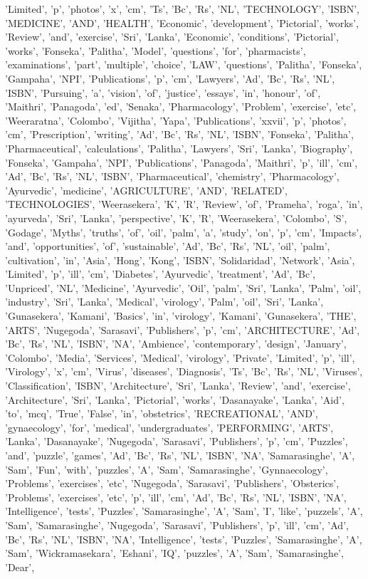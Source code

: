 'Limited', 'p', 'photos', 'x', 'cm', 'Ts', 'Bc', 'Rs', 'NL', 'TECHNOLOGY', 'ISBN', 'MEDICINE', 'AND', 'HEALTH', 'Economic', 'development', 'Pictorial', 'works', 'Review', 'and', 'exercise', 'Sri', 'Lanka', 'Economic', 'conditions', 'Pictorial', 'works', 'Fonseka', 'Palitha', 'Model', 'questions', 'for', 'pharmacists', 'examinations', 'part', 'multiple', 'choice', 'LAW', 'questions', 'Palitha', 'Fonseka', 'Gampaha', 'NPI', 'Publications', 'p', 'cm', 'Lawyers', 'Ad', 'Bc', 'Rs', 'NL', 'ISBN', 'Pursuing', 'a', 'vision', 'of', 'justice', 'essays', 'in', 'honour', 'of', 'Maithri', 'Panagoda', 'ed', 'Senaka', 'Pharmacology', 'Problem', 'exercise', 'etc', 'Weeraratna', 'Colombo', 'Vijitha', 'Yapa', 'Publications', 'xxvii', 'p', 'photos', 'cm', 'Prescription', 'writing', 'Ad', 'Bc', 'Rs', 'NL', 'ISBN', 'Fonseka', 'Palitha', 'Pharmaceutical', 'calculations', 'Palitha', 'Lawyers', 'Sri', 'Lanka', 'Biography', 'Fonseka', 'Gampaha', 'NPI', 'Publications', 'Panagoda', 'Maithri', 'p', 'ill', 'cm', 'Ad', 'Bc', 'Rs', 'NL', 'ISBN', 'Pharmaceutical', 'chemistry', 'Pharmacology', 'Ayurvedic', 'medicine', 'AGRICULTURE', 'AND', 'RELATED', 'TECHNOLOGIES', 'Weerasekera', 'K', 'R', 'Review', 'of', 'Prameha', 'roga', 'in', 'ayurveda', 'Sri', 'Lanka', 'perspective', 'K', 'R', 'Weerasekera', 'Colombo', 'S', 'Godage', 'Myths', 'truths', 'of', 'oil', 'palm', 'a', 'study', 'on', 'p', 'cm', 'Impacts', 'and', 'opportunities', 'of', 'sustainable', 'Ad', 'Bc', 'Rs', 'NL', 'oil', 'palm', 'cultivation', 'in', 'Asia', 'Hong', 'Kong', 'ISBN', 'Solidaridad', 'Network', 'Asia', 'Limited', 'p', 'ill', 'cm', 'Diabetes', 'Ayurvedic', 'treatment', 'Ad', 'Bc', 'Unpriced', 'NL', 'Medicine', 'Ayurvedic', 'Oil', 'palm', 'Sri', 'Lanka', 'Palm', 'oil', 'industry', 'Sri', 'Lanka', 'Medical', 'virology', 'Palm', 'oil', 'Sri', 'Lanka', 'Gunasekera', 'Kamani', 'Basics', 'in', 'virology', 'Kamani', 'Gunasekera', 'THE', 'ARTS', 'Nugegoda', 'Sarasavi', 'Publishers', 'p', 'cm', 'ARCHITECTURE', 'Ad', 'Bc', 'Rs', 'NL', 'ISBN', 'NA', 'Ambience', 'contemporary', 'design', 'January', 'Colombo', 'Media', 'Services', 'Medical', 'virology', 'Private', 'Limited', 'p', 'ill', 'Virology', 'x', 'cm', 'Virus', 'diseases', 'Diagnosis', 'Ts', 'Bc', 'Rs', 'NL', 'Viruses', 'Classification', 'ISBN', 'Architecture', 'Sri', 'Lanka', 'Review', 'and', 'exercise', 'Architecture', 'Sri', 'Lanka', 'Pictorial', 'works', 'Dasanayake', 'Lanka', 'Aid', 'to', 'mcq', 'True', 'False', 'in', 'obstetrics', 'RECREATIONAL', 'AND', 'gynaecology', 'for', 'medical', 'undergraduates', 'PERFORMING', 'ARTS', 'Lanka', 'Dasanayake', 'Nugegoda', 'Sarasavi', 'Publishers', 'p', 'cm', 'Puzzles', 'and', 'puzzle', 'games', 'Ad', 'Bc', 'Rs', 'NL', 'ISBN', 'NA', 'Samarasinghe', 'A', 'Sam', 'Fun', 'with', 'puzzles', 'A', 'Sam', 'Samarasinghe', 'Gynnaecology', 'Problems', 'exercises', 'etc', 'Nugegoda', 'Sarasavi', 'Publishers', 'Obsterics', 'Problems', 'exercises', 'etc', 'p', 'ill', 'cm', 'Ad', 'Bc', 'Rs', 'NL', 'ISBN', 'NA', 'Intelligence', 'tests', 'Puzzles', 'Samarasinghe', 'A', 'Sam', 'I', 'like', 'puzzels', 'A', 'Sam', 'Samarasinghe', 'Nugegoda', 'Sarasavi', 'Publishers', 'p', 'ill', 'cm', 'Ad', 'Bc', 'Rs', 'NL', 'ISBN', 'NA', 'Intelligence', 'tests', 'Puzzles', 'Samarasinghe', 'A', 'Sam', 'Wickramasekara', 'Eshani', 'IQ', 'puzzles', 'A', 'Sam', 'Samarasinghe', 'Dear', 